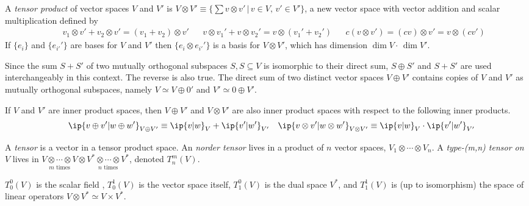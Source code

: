 \documentclass[11pt,fleqn]{article}
\numberwithin{equation}{section}
\begin{document}
\begin{dfn}\label{tensor-product-v-otimes-v'}
A \textit{tensor product} of vector spaces $V$ and $V'$ is $V\otimes V'\equiv\{\sum v\otimes v'\,|\,v\in V,\,v'\in V'\}$, a new vector space with vector addition and scalar multiplication defined by
\begin{align}
&&
  v_1\otimes v'
+
  v_2\otimes v'
=
  (v_1 + v_2)\otimes v'
&&
  v\otimes v_1'
+
  v\otimes v_2'
=
  v\otimes(v_1' + v_2')
&&
  c(v\otimes v')
=
  (cv)\otimes v'
=
  v\otimes(cv')
\end{align}
If $\{e_i\}$ and $\{e_{i'}'\}$ are bases for $V$ and $V'$ then $\{e_i\otimes e_{i'}'\}$ is a basis for $V\otimes V'$, which has dimension $\dim V\cdot\,\dim V'$.
\end{dfn}

\begin{rmk}
Since the sum $S+S'$ of two mutually orthogonal subspaces $S, S\subseteq V$ is isomorphic to their direct sum, $S\oplus S'$ and $S+S'$ are used interchangeably in this context.
The reverse is also true.
The direct sum of two distinct vector spaces $V\oplus V'$ contains copies of $V$ and $V'$ as mutually orthogonal subspaces, namely $V\simeq V\oplus0'$ and $V'\simeq 0\oplus V'$.
\end{rmk}

\begin{dfn}
If $V$ and $V'$ are inner product spaces, then $V\oplus V'$ and $V\otimes V'$ are also inner product spaces with respect to the following inner products.
\begin{align}
&&
  \ip{v\oplus v'|w\oplus w'}_{V\oplus V'}
\equiv
  \ip{v|w}_V
+
  \ip{v'|w'}_{V'}
&&
  \ip{v\otimes v'|w\otimes w'}_{V\otimes V'}
\equiv
  \ip{v|w}_V
\cdot
  \ip{v'|w'}_{V'}
\end{align}
\end{dfn}

\begin{dfn}\label{tensor}
A \textit{tensor} is a vector in a tensor product space.
An \textit{n\eth order tensor} lives in a product of $n$ vector spaces, $V_1\otimes\cdots\otimes V_n$.
A \textit{type-(m,n) tensor on $V$} lives in $\underset{\text{$m$ times}}{V\otimes\cdots\otimes V}\otimes \underset{\text{$n$ times}}{V^*\otimes\cdots \otimes V^*}$, denoted $T_n^m(V)$.
\end{dfn}

\begin{ex}
$T_0^0(V)$ is the scalar field ,
$T_0^1(V)$ is the vector space itself, $T_1^0(V)$ is the dual space $V^*$, and $T_1^1(V)$ is (up to isomorphism) the space of linear operators $V\otimes V^*\simeq V\times V^*$.
\end{ex}
\end{document}
